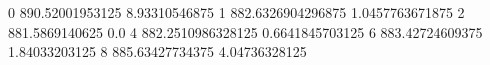 0 890.52001953125 8.93310546875
1 882.6326904296875 1.0457763671875
2 881.5869140625 0.0
4 882.2510986328125 0.6641845703125
6 883.42724609375 1.84033203125
8 885.63427734375 4.04736328125
